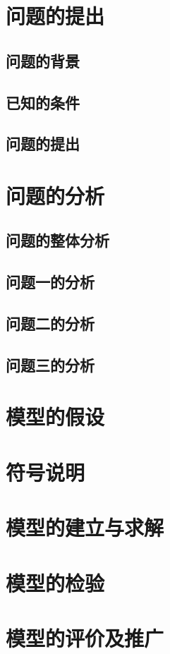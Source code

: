 \documentclass{JXUSTmodeling}
\begin{document}
    \section{问题的提出}\label{sec:1}
    \subsection{问题的背景}\label{sub:1.1}
    \subsection{已知的条件}\label{sub:1.2}
    \subsection{问题的提出}\label{sub:1.3}

    \section{问题的分析}\label{sec:2}
    \subsection{问题的整体分析}\label{sub:2.1}
    \subsection{问题一的分析}\label{sub:2.2}
    \subsection{问题二的分析}\label{sub:2.3}
    \subsection{问题三的分析}\label{sub:2.4}

    \section{模型的假设}\label{sec:3}

    \section{符号说明}\label{sec:4}

    \section{模型的建立与求解}\label{sec:5}

    \section{模型的检验}\label{sec:6}

    \section{模型的评价及推广}\label{sec:7}

    
    
\end{document}
